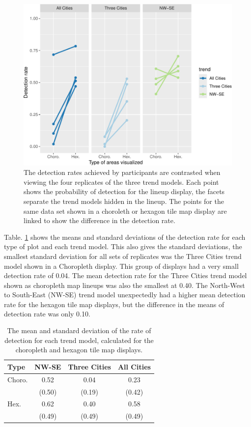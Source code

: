 \documentclass[
]{article}
\begin{document}
\begin{figure}
\includegraphics[width=1\linewidth]{paper_files/figure-latex/detect-compare-1} \caption{The detection rates achieved by participants are contrasted when viewing the four replicates of the three trend models. Each point shows the probability of detection for the lineup display, the facets separate the trend models hidden in the lineup. The points for the same data set shown in a choroleth or hexagon tile map display are linked to show the difference in the detection rate.}\label{fig:detect-compare}
\end{figure}

Table. \ref{tab:desc-stats} shows the means and standard deviations of
the detection rate for each type of plot and each trend model. This also
gives the standard deviations, the smallest standard deviation for all
sets of replicates was the Three Cities trend model shown in a
Choropleth display. This group of displays had a very small detection
rate of 0.04. The mean detection rate for the Three Cities trend model
shown as choropleth map lineups was also the smallest at 0.40. The
North-West to South-East (NW-SE) trend model unexpectedly had a higher
mean detection rate for the hexagon tile map displays, but the
difference in the means of detection rate was only 0.10.

\begin{table}

\caption{\label{tab:desc-stats}The mean and standard deviation of the rate of detection for each trend model, calculated for the choropleth and hexagon tile map displays.}
\centering
\begin{tabular}[t]{lccc}
\toprule
Type & NW-SE & Three Cities & All Cities\\
\midrule
Choro. & 0.52 & 0.04 & 0.23\\
 & (0.50) & (0.19) & (0.42)\\
\addlinespace
Hex. & 0.62 & 0.40 & 0.58\\
 & (0.49) & (0.49) & (0.49)\\
\bottomrule
\end{tabular}
\end{table}
\end{document}
